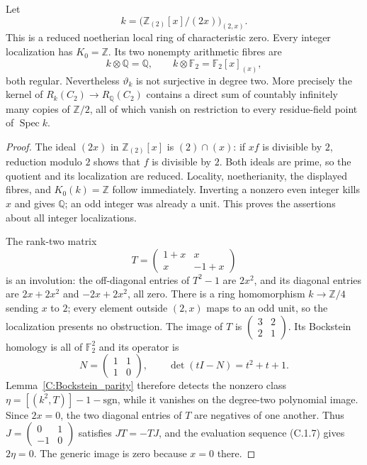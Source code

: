 \begin{proposition}
\label{C:reduced_regular_fibres}
Let
\[
 k=\bigl(\mathbb Z_{(2)}[x]/(2x)\bigr)_{(2,x)}.
\]
This is a reduced noetherian local ring of characteristic zero.
Every integer localization has $K_0=\mathbb Z$. Its two nonempty
arithmetic fibres are
\[
 k\otimes\mathbb Q=\mathbb Q,
 \qquad k\otimes\mathbb F_2=\mathbb F_2[x]_{(x)},
\]
both regular. Nevertheless $\vartheta_k$ is not surjective in
degree two. More precisely the kernel of
$R_k(C_2)\to R_{\mathbb Q}(C_2)$ contains a direct sum of
countably infinitely many copies of $\mathbb Z/2$, all of which
vanish on restriction to every residue-field point of
$\operatorname{Spec}k$.
\end{proposition}
\begin{proof}
The ideal $(2x)$ in $\mathbb Z_{(2)}[x]$ is $(2)\cap(x)$:
if $xf$ is divisible by $2$, reduction modulo $2$ shows that $f$
is divisible by $2$. Both ideals are prime, so the quotient and
its localization are reduced. Locality, noetherianity, the displayed
fibres, and $K_0(k)=\mathbb Z$ follow immediately. Inverting a
nonzero even integer kills $x$ and gives $\mathbb Q$; an odd
integer was already a unit. This proves the assertions about
all integer localizations.

The rank-two matrix
\[
 T=\begin{pmatrix}1+x&x\\x&-1+x\end{pmatrix}           \tag{C.1.19}
\]
is an involution: the off-diagonal entries of $T^2-1$ are
$2x^2$, and its diagonal entries are $2x+2x^2$ and
$-2x+2x^2$, all zero. There is a ring homomorphism
$k\to\mathbb Z/4$ sending $x$ to $2$; every element outside
$(2,x)$ maps to an odd unit, so the localization presents no
obstruction. The image of $T$ is
$\left(\begin{smallmatrix}3&2\\2&1\end{smallmatrix}\right)$.
Its Bockstein homology is all of $\mathbb F_2^2$ and its
operator is
\[
 N=\begin{pmatrix}1&1\\1&0\end{pmatrix},
 \qquad\det(tI-N)=t^2+t+1.
\]
Lemma~\ref{C:Bockstein_parity} therefore detects the nonzero
class $\eta=[(k^2,T)]-1-\mathrm{sgn}$, while it vanishes on
the degree-two polynomial image. Since $2x=0$, the two diagonal
entries of $T$ are negatives of one another. Thus
$J=\left(\begin{smallmatrix}0&1\\-1&0\end{smallmatrix}\right)$
satisfies $JT=-TJ$, and the evaluation sequence (C.1.7) gives
$2\eta=0$. The generic image is zero because $x=0$ there.


\end{proof}
